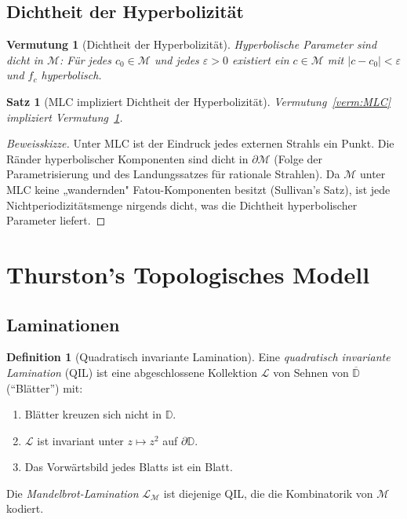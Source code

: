 \documentclass[12pt,a4paper]{amsart}
\newtheorem{satz}[theorem]{Satz}
\newtheorem{vermutung}[theorem]{Vermutung}
\theoremstyle{definition}
\newtheorem{definition_de}[theorem]{Definition}
\theoremstyle{remark}
\begin{document}
\subsection{Dichtheit der Hyperbolizität}

\begin{vermutung}[Dichtheit der Hyperbolizität]
\label{verm:Hyp}
Hyperbolische Parameter sind dicht in $\mathcal{M}$: Für jedes
$c_0 \in \mathcal{M}$ und jedes $\varepsilon > 0$ existiert ein
$c \in \mathcal{M}$ mit $|c - c_0| < \varepsilon$ und $f_c$ hyperbolisch.
\end{vermutung}

\begin{satz}[MLC impliziert Dichtheit der Hyperbolizität]
Vermutung~\ref{verm:MLC} impliziert Vermutung~\ref{verm:Hyp}.
\end{satz}

\begin{proof}[Beweisskizze]
Unter MLC ist der Eindruck jedes externen Strahls ein Punkt. Die Ränder
hyperbolischer Komponenten sind dicht in $\partial\mathcal{M}$ (Folge der
Parametrisierung und des Landungssatzes für rationale Strahlen). Da $\mathcal{M}$
unter MLC keine „wandernden" Fatou-Komponenten besitzt (Sullivan's Satz),
ist jede Nichtperiodizitätsmenge nirgends dicht, was die Dichtheit
hyperbolischer Parameter liefert.
\end{proof}

\section{Thurston's Topologisches Modell}

\subsection{Laminationen}

\begin{definition_de}[Quadratisch invariante Lamination]
Eine \emph{quadratisch invariante Lamination} (QIL) ist eine abgeschlossene
Kollektion $\mathcal{L}$ von Sehnen von $\overline{\mathbb{D}}$
(``Blätter'') mit:
\begin{enumerate}[label=\roman*)]
\item Blätter kreuzen sich nicht in $\mathbb{D}$.
\item $\mathcal{L}$ ist invariant unter $z \mapsto z^2$ auf $\partial \mathbb{D}$.
\item Das Vorwärtsbild jedes Blatts ist ein Blatt.
\end{enumerate}
Die \emph{Mandelbrot-Lamination} $\mathcal{L}_{\mathcal{M}}$ ist diejenige
QIL, die die Kombinatorik von $\mathcal{M}$ kodiert.
\end{definition_de}
\end{document}
